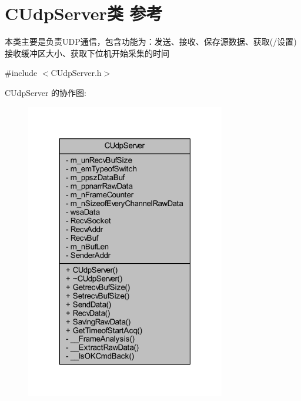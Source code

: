 \hypertarget{class_c_udp_server}{}\section{C\+Udp\+Server类 参考}
\label{class_c_udp_server}


本类主要是负责\+U\+D\+P通信，包含功能为：发送、接收、保存源数据、获取(/设置)接收缓冲区大小、获取下位机开始采集的时间  




{\ttfamily \#include $<$C\+Udp\+Server.\+h$>$}



C\+Udp\+Server 的协作图\+:\nopagebreak
\begin{figure}[H]
\begin{center}
\leavevmode
\includegraphics[width=247pt]{class_c_udp_server__coll__graph}
\end{center}
\end{figure}
